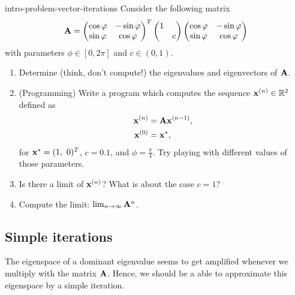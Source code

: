 
\begin{Problem}{intro-problem-vector-iterations}
	Consider the following matrix
	\begin{gather*}
	\mathbf A =
	\begin{pmatrix}
	\cos\varphi & -\sin\varphi\\
	\sin\varphi &  \cos\varphi
	\end{pmatrix}^T
	\begin{pmatrix}
	1 & \\
	& c
	\end{pmatrix}
	\begin{pmatrix}
	\cos\varphi & -\sin\varphi\\
	\sin\varphi &  \cos\varphi
	\end{pmatrix}
	\end{gather*}
	with parameters $\phi\in[0,2\pi]$ and $c\in(0,1)$.
	\begin{enumerate}
		\item Determine (think, don't compute!) the eigenvalues and eigenvectors of $\mathbf A$.
		\item (Programming) Write a program which computes the sequence
		$\mathbf x^{(n)}\in\mathbb R^2$ defined as
		\begin{align*}
		\mathbf x^{(n)} &= \mathbf A \mathbf x^{(n-1)}, \\
		\mathbf x^{(0)} &= \mathbf x^{*},
		\end{align*}
		for $\vx^{*} = (1,\ 0)^T$, $c = 0.1$, and
		$\phi=\frac\pi4$. Try playing with different values of those
		parameters.
		\item Is there a limit of $\mathbf x^{(n)}$? What is about the case
		$c=1$?
		\item Compute the limit: $\lim_{n\to\infty}\mathbf A^n$.
	\end{enumerate}
\end{Problem}


\subsection{Simple iterations}

\begin{intro}
  The eigenspace of a dominant eigenvalue seems to get amplified
  whenever we multiply with the matrix $\mathbf A$. Hence, we should be a
  able to approximate this eigenspace by a simple iteration.
\end{intro}

